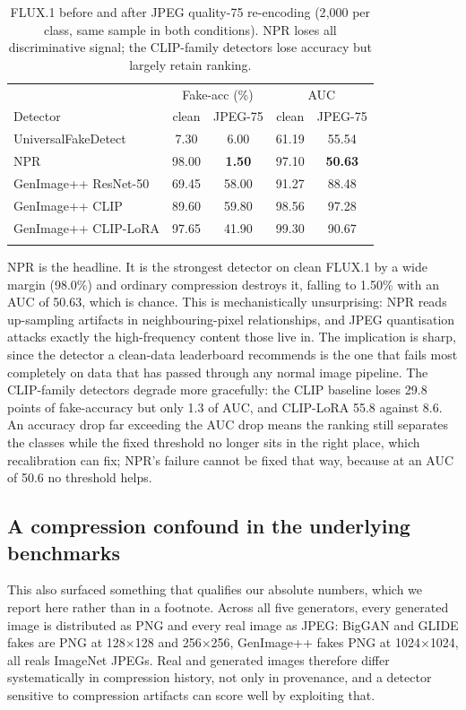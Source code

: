 \documentclass[3p,times,procedia]{elsarticle}
\begin{document}
\begin{table}[h]
\caption{FLUX.1 before and after JPEG quality-75 re-encoding (2{,}000 per
class, same sample in both conditions). NPR loses all discriminative
signal; the CLIP-family detectors lose accuracy but largely retain ranking.}
\label{tab:jpeg}
\begin{tabular*}{\hsize}{@{\extracolsep{\fill}}lcccc@{}}
\toprule
& \multicolumn{2}{c}{Fake-acc (\%)} & \multicolumn{2}{c}{AUC} \\
Detector & clean & JPEG-75 & clean & JPEG-75 \\
\colrule
UniversalFakeDetect & 7.30 & 6.00 & 61.19 & 55.54 \\
NPR & 98.00 & \textbf{1.50} & 97.10 & \textbf{50.63} \\
GenImage++ ResNet-50 & 69.45 & 58.00 & 91.27 & 88.48 \\
GenImage++ CLIP & 89.60 & 59.80 & 98.56 & 97.28 \\
GenImage++ CLIP-LoRA & 97.65 & 41.90 & 99.30 & 90.67 \\
\botrule
\end{tabular*}
\end{table}

NPR is the headline. It is the strongest detector on clean FLUX.1 by a wide
margin (98.0\%) and ordinary compression destroys it, falling to 1.50\%
with an AUC of 50.63, which is chance. This is mechanistically
unsurprising: NPR reads up-sampling artifacts in neighbouring-pixel
relationships, and JPEG quantisation attacks exactly the high-frequency
content those live in. The implication is sharp, since the detector a
clean-data leaderboard recommends is the one that fails most completely on
data that has passed through any normal image pipeline. The CLIP-family
detectors degrade more gracefully: the CLIP baseline loses 29.8 points of
fake-accuracy but only 1.3 of AUC, and CLIP-LoRA 55.8 against 8.6. An
accuracy drop far exceeding the AUC drop means the ranking still separates
the classes while the fixed threshold no longer sits in the right place,
which recalibration can fix; NPR's failure cannot be fixed that way,
because at an AUC of 50.6 no threshold helps.

\subsection{A compression confound in the underlying benchmarks}
\label{sec:jpeg-confound}

This also surfaced something that qualifies our absolute numbers, which we
report here rather than in a footnote. Across all five generators, every
generated image is distributed as PNG and every real image as JPEG: BigGAN
and GLIDE fakes are PNG at 128$\times$128 and 256$\times$256, GenImage++
fakes PNG at 1024$\times$1024, all reals ImageNet JPEGs. Real and generated
images therefore differ systematically in compression history, not only in
provenance, and a detector sensitive to compression artifacts can score
well by exploiting that.
\end{document}
